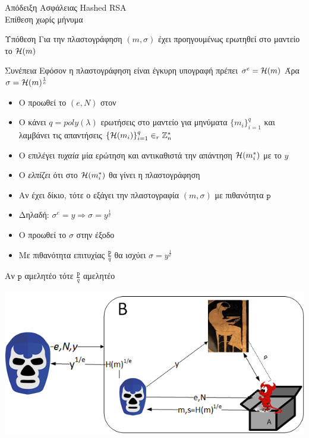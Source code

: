 \documentclass[handout]{beamer}
\begin{document}
\begin{frame}[allowframebreaks]{Απόδειξη Ασφάλειας Hashed RSA \\ Επίθεση χωρίς μήνυμα} 

\begin{block}{Υπόθεση}
Για την πλαστογράφηση $(m,\sigma)$ έχει προηγουμένως ερωτηθεί στο μαντείο το $\mathcal{H}(m)$
\end{block}

\begin{block}{Συνέπεια}
Εφόσον η πλαστογράφηση είναι έγκυρη υπογραφή πρέπει $\sigma^e = \mathcal{H}(m)$
Άρα $\sigma = \mathcal{H}(m)^{\frac{1}{e}}$
\end{block}

\framebreak

\begin{itemize}
\item Ο \advb προωθεί το $(e,N)$ στον \adv
\item O \adv κάνει $q=poly(\lambda)$ ερωτήσεις στο μαντείο για μηνύματα $\{m_i\}_{i=1}^q$ και λαμβάνει τις απαντήσεις $\{\mathcal{H}(m_i)\}_{i=1}^q \in_r \mathbb{Z}^*_n$
\item Ο \advb επιλέγει \emph{τυχαία} μία ερώτηση και αντικαθιστά την απάντηση $\mathcal{H}(m_i^*)$ με το $y$
\item Ο \advb \emph{ελπίζει} ότι στο $\mathcal{H}(m_i^*)$ θα γίνει η πλαστογράφηση
\item Αν έχει δίκιο, τότε ο \adv εξάγει την πλαστογραφία $(m,\sigma)$ με πιθανότητα $\mathtt{p}$
\item Δηλαδή: $\sigma^e = y \Rightarrow \sigma = y^\frac{1}{e}$
\item Ο \advb προωθεί το $\sigma$ στην έξοδο
\item Με πιθανότητα επιτυχίας $\frac{\mathtt{p}}{q}$ θα ισχύει $\sigma = y^\frac{1}{e}$
\end{itemize}

\begin{center}
Αν $\mathrm{\mathtt{p}}$ αμελητέο τότε $\frac{\mathtt{p}}{q}$ αμελητέο
\end{center}

\framebreak
\begin{center}
\includegraphics[scale=0.7]{ro-nom.png}
\end{center}
\end{frame}
\end{document}
